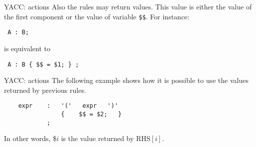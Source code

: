 \begin{frame}[fragile]{YACC: actions}
Also the rules may return values. This value is either
the value of the first component or the value of variable  \verb"$$".
For instance:


\vspace{20pt}

\verb" A : B;"


\vspace{20pt}

is equivalent to


\vspace{20pt}

\verb" A : B { $$ = $1; } ;"



\end{frame}

\begin{frame}[fragile]{YACC: actions}
The following example shows how it is possible
to use the values returned by previous rules.


\vspace{20pt}

\begin{verbatim}
    expr    :   '('   expr   ')'
                {    $$ = $2;   }
            ;
\end{verbatim}


\vspace{20pt}

In other words, \$$i$  is the value returned by  RHS$[i]$.
\end{frame}

